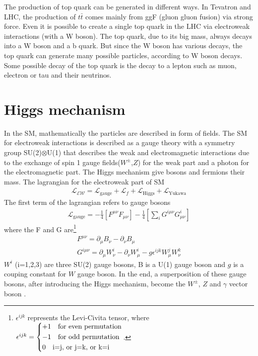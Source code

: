The production of top quark can be generated in different ways. In Tevatron and LHC, the production of $t\bar{t}$ comes mainly from ggF (gluon gluon fusion) via strong force. Even it is possible to create a single top quark in the LHC via electroweak interactions (with a W boson)\cite{th1}. 
The top quark, due to its big mass, always decays into a W boson and a b quark. But since the W boson has various decays, the top quark can generate many possible particles, according to W boson decays. Some possible decay of the top quark is the decay to a lepton such as muon, electron or tau and their neutrinos. %

\section{Higgs mechanism}
\label{sec:higgsmechanism}
In the SM, mathematically the particles are described in form of fields. The SM for electroweak interactions is described as a gauge theory with a symmetry group SU(2)$\otimes$U(1)
that describes the weak and electromagnetic interactions
due to the exchange of spin 1 gauge fields($W^{\pm}$,$Z$) for the weak part and a photon for the electromagnetic part. The Higgs mechanism give bosons and fermions their mass. The lagrangian for the electroweak part of SM
\begin{align}\label{sml}
\mathcal{L_{\text{EW}}}=\mathcal{L}_\text{gauge}+\mathcal{L}_f +\mathcal{L}_\text{Higgs} + \mathcal{L}_\text{Yukawa}
\end{align}
The first term of the lagrangian refers to gauge bosons 
 \begin{align}\label{smg}
 \mathcal{L}_\text{gauge}=-\frac{1}{4}\left[F^{\mu\nu}F_{\mu\nu}\right]-\frac{1}{4}\left[\sum_{i}G^{i\mu\nu}G^i_{\mu\nu}\right]
 \end{align}
where the F and G are\footnote{$\epsilon^{ijk}$ represents the Levi-Civita tensor, where $\epsilon^{ijk}= \begin{dcases}
	+1 \quad \text{for even permutation} \\
	-1 \quad \text{for odd permutation}\\
	0 \quad \text{i=j, or j=k, or k=i } 
	\end{dcases}$.} 
\begin{align}
F^{\mu \nu}=\partial_\mu B_\nu -\partial_\nu B_\mu \\
G^{i\mu\nu}=\partial_\mu W^i_\nu -\partial_\nu W^i_\mu -g\epsilon^{ijk}W^j_\mu W^k_\nu 
\end{align}
$W^i$ (i=1,2,3) are three SU(2) gauge bosons, B is a U(1) gauge boson and $g$  is a couping constant for $W$ gauge boson. In the end, a superposition of these gauge bosons, after introducing the Higgs mechanism, become the $W^\pm$, $Z$ and $\gamma$ vector boson
\cite{ew1,ew2}. %

